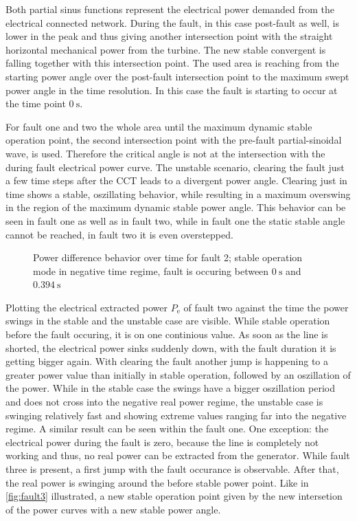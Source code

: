 Both partial sinus functions represent the electrical power demanded from the electrical connected network. During the fault, in this case post-fault as well, is lower in the peak and thus giving another intersection point with the straight horizontal mechanical power from the turbine. The new stable convergent is falling together with this intersection point. The used area is reaching from the starting power angle over the post-fault intersection point to the maximum swept power angle in the time resolution. In this case the fault is starting to occur at the time point $0~\mathrm{s}$.

For fault one and two the whole area until the maximum dynamic stable operation point, the second intersection point with the pre-fault partial-sinoidal wave, is used. Therefore the critical angle is not at the intersection with the during fault electrical power curve. The unstable scenario, clearing the fault just a few time steps after the \acs{CCT} leads to a divergent power angle. Clearing just in time shows a stable, oszillating behavior, while resulting in a maximum overswing in the region of the maximum dynamic stable power angle. This behavior can be seen in fault one as well as in fault two, while in fault one the static stable angle cannot be reached, in fault two it is even overstepped.

\begin{figure}[H]
        \centering
        
        \caption[Power difference behavior over time for fault 2]{Power difference behavior over time for fault 2; stable operation mode in negative time regime, fault is occuring between $0~\mathrm{s}$ and $0.394~\mathrm{s}$}
        \label{fig:pd-fault2}
\end{figure}

Plotting the electrical extracted power $P_\mathrm{e}$ of fault two against the time the power swings in the stable and the unstable case are visible. While stable operation before the fault occuring, it is on one continious value. As soon as the line is shorted, the electrical power sinks suddenly down, with the fault duration it is getting bigger again. With clearing the fault another jump is happening to a greater power value than initially in stable operation, followed by an oszillation of the power. While in the stable case the swings have a bigger oszillation period and does not cross into the negative real power regime, the unstable case is swinging relatively fast and showing extreme values ranging far into the negative regime. A similar result can be seen within the fault one. One exception: the electrical power during the fault is zero, because the line is completely not working and thus, no real power can be extracted from the generator. While fault three is present, a first jump with the fault occurance is observable. After that, the real power is swinging around the before stable power point. Like in \autoref{fig:fault3} illustrated, a new stable operation point given by the new intersetion of the power curves with a new stable power angle.


